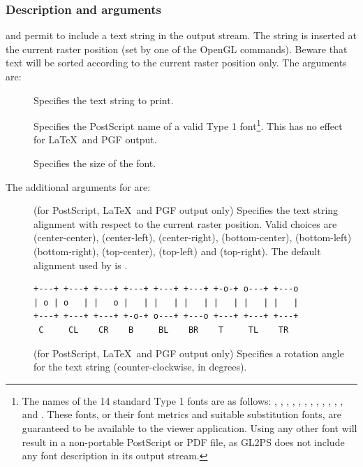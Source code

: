 \subsubsection{Description and arguments}

 and  permit to include a text string
in the output stream. The string is inserted at the current raster
position (set by one of the  OpenGL commands). Beware
that text will be sorted according to the current raster position
only. The arguments are:

\begin{description}
\item[] Specifies the text string to print.
\item[] Specifies the PostScript name of a valid Type 1
  font\footnote{The names of the 14 standard Type 1 fonts are as
    follows: , , ,
    , , ,
    , , ,
    , , ,
     and .  These fonts, or their font
    metrics and suitable substitution fonts, are guaranteed to be
    available to the viewer application. Using any other font will
    result in a non-portable PostScript or PDF file, as GL2PS does not
    include any font description in its output stream.}.  This has no
  effect for \LaTeX\ and PGF output.
\item[] Specifies the size of the font.
\end{description}

The additional arguments for  are:

\begin{description}
\item[] (for PostScript, \LaTeX\ and PGF output only)
  Specifies the text string alignment with respect to the current
  raster position. Valid choices are 
  (center-center),  (center-left),
   (center-right), 
  (bottom-center),  (bottom-left) 
  (bottom-right),  (top-center), 
  (top-left) and  (top-right). The default alignment
  used by  is .

\begin{verbatim}
+---+ +---+ +---+ +---+ +---+ +---+ +-o-+ o---+ +---o
| o | o   | |   o |   | |   | |   | |   | |   | |   |
+---+ +---+ +---+ +-o-+ o---+ +---o +---+ +---+ +---+
 C     CL    CR    B     BL    BR    T     TL    TR
\end{verbatim}

\item[] (for PostScript, \LaTeX\ and PGF output only)
  Specifies a rotation angle for the text string (counter-clockwise,
  in degrees).
\end{description}


